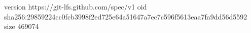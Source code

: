 version https://git-lfs.github.com/spec/v1
oid sha256:29859224cc0fcb3998f2ed725e64a51647a7ec7c596f5613eaa7fa9dd56d5592
size 469074
